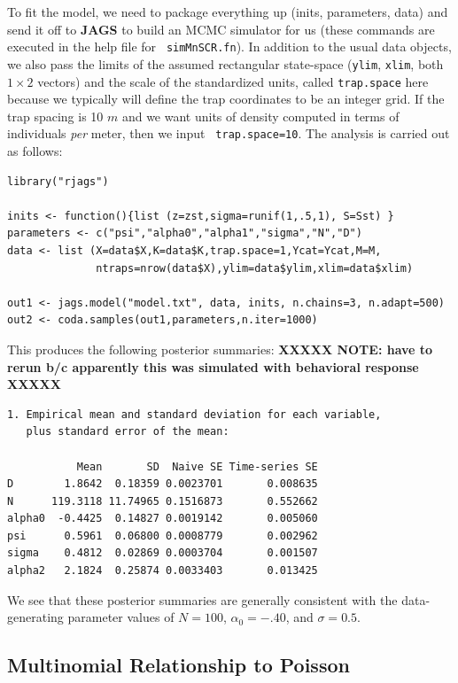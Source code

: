 To fit the model, we need to package everything up (inits, parameters,
data) and send it off to \mbox{\bf JAGS} to build an MCMC simulator
for us (these commands are executed in the help file for \mbox{\tt
  simMnSCR.fn}). In addition to the usual data objects, we also pass
the limits of the assumed rectangular state-space (\mbox{\tt ylim},
\mbox{\tt xlim}, both $1 \times 2$ vectors) and the scale of the
standardized units, called \mbox{\tt trap.space} here because we
typically will define the trap coordinates to be an integer grid. If
the trap spacing is 10 $m$ and we want units of density computed in
terms of individuals {\it per} meter, then we input \mbox{\tt
  trap.space=10}. The analysis is carried out as follows: 
{\small
\begin{verbatim}
library("rjags")

inits <- function(){list (z=zst,sigma=runif(1,.5,1), S=Sst) }
parameters <- c("psi","alpha0","alpha1","sigma","N","D")
data <- list (X=data$X,K=data$K,trap.space=1,Ycat=Ycat,M=M,
              ntraps=nrow(data$X),ylim=data$ylim,xlim=data$xlim)

out1 <- jags.model("model.txt", data, inits, n.chains=3, n.adapt=500)
out2 <- coda.samples(out1,parameters,n.iter=1000)
\end{verbatim}
}
This produces the following posterior summaries: {\bf XXXXX NOTE: have
  to rerun b/c apparently this was simulated with behavioral response XXXXX}
{\small
\begin{verbatim}
1. Empirical mean and standard deviation for each variable,
   plus standard error of the mean:

           Mean       SD  Naive SE Time-series SE
D        1.8642  0.18359 0.0023701       0.008635
N      119.3118 11.74965 0.1516873       0.552662
alpha0  -0.4425  0.14827 0.0019142       0.005060
psi      0.5961  0.06800 0.0008779       0.002962
sigma    0.4812  0.02869 0.0003704       0.001507
alpha2   2.1824  0.25874 0.0033403       0.013425

\end{verbatim}
}
We see that these posterior summaries are generally
consistent with the data-generating parameter values of
$N=100$, $\alpha_{0}= -.40$, and $\sigma=0.5$.


\subsection{Multinomial Relationship to Poisson}

